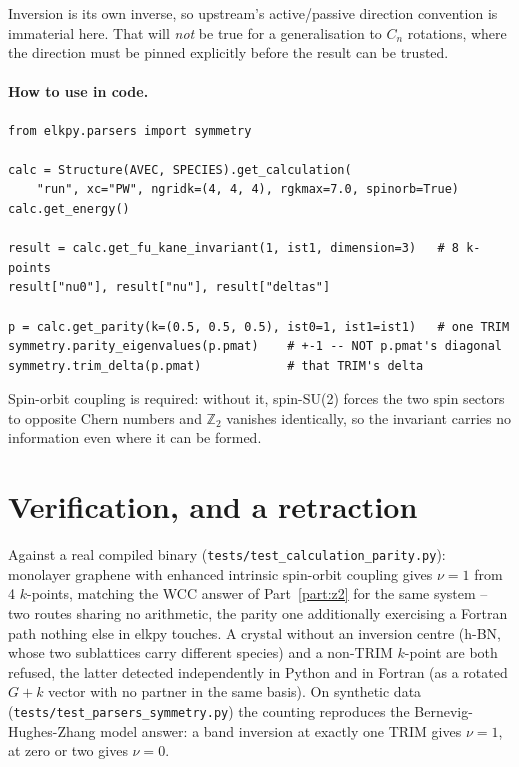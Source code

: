 \documentclass[11pt]{article}
\begin{document}
Inversion is its own inverse, so upstream's active/passive direction convention is
immaterial here. That will \emph{not} be true for a generalisation to $C_n$ rotations,
where the direction must be pinned explicitly before the result can be trusted.

\paragraph{How to use in code.}
\begin{verbatim}
from elkpy.parsers import symmetry

calc = Structure(AVEC, SPECIES).get_calculation(
    "run", xc="PW", ngridk=(4, 4, 4), rgkmax=7.0, spinorb=True)
calc.get_energy()

result = calc.get_fu_kane_invariant(1, ist1, dimension=3)   # 8 k-points
result["nu0"], result["nu"], result["deltas"]

p = calc.get_parity(k=(0.5, 0.5, 0.5), ist0=1, ist1=ist1)   # one TRIM
symmetry.parity_eigenvalues(p.pmat)    # +-1 -- NOT p.pmat's diagonal
symmetry.trim_delta(p.pmat)            # that TRIM's delta
\end{verbatim}
Spin-orbit coupling is required: without it, spin-SU(2) forces the two spin sectors to
opposite Chern numbers and $\mathbb Z_2$ vanishes identically, so the invariant carries
no information even where it can be formed.

\section{Verification, and a retraction}
\label{sec:parity-verification}

Against a real compiled binary (\texttt{tests/test\_calculation\_parity.py}): monolayer
graphene with enhanced intrinsic spin-orbit coupling gives $\nu=1$ from 4 $k$-points,
matching the WCC answer of Part~\ref{part:z2} for the same system -- two routes sharing
no arithmetic, the parity one additionally exercising a Fortran path nothing else in
elkpy touches. A crystal without an inversion centre (h-BN, whose two sublattices carry
different species) and a non-TRIM $k$-point are both refused, the latter detected
independently in Python and in Fortran (as a rotated $G+k$ vector with no partner in the
same basis). On synthetic data (\texttt{tests/test\_parsers\_symmetry.py}) the counting
reproduces the Bernevig-Hughes-Zhang model answer: a band inversion at exactly one TRIM
gives $\nu=1$, at zero or two gives $\nu=0$.
\end{document}
